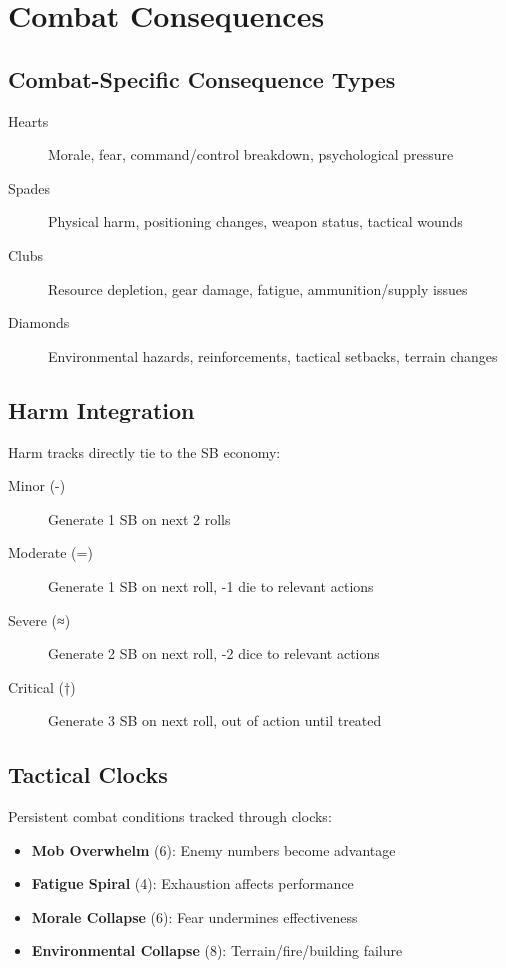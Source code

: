 \section{Combat Consequences}

\subsection*{Combat-Specific Consequence Types}
\begin{description}
  \item[Hearts] Morale, fear, command/control breakdown, psychological pressure
  \item[Spades] Physical harm, positioning changes, weapon status, tactical wounds
  \item[Clubs] Resource depletion, gear damage, fatigue, ammunition/supply issues
  \item[Diamonds] Environmental hazards, reinforcements, tactical setbacks, terrain changes
\end{description}

\subsection*{Harm Integration}
Harm tracks directly tie to the SB economy:
\begin{description}
  \item[Minor (-)] Generate 1 SB on next 2 rolls
  \item[Moderate (=)] Generate 1 SB on next roll, -1 die to relevant actions
  \item[Severe (≈)] Generate 2 SB on next roll, -2 dice to relevant actions  
  \item[Critical (†)] Generate 3 SB on next roll, out of action until treated
\end{description}

\subsection*{Tactical Clocks}
Persistent combat conditions tracked through clocks:
\begin{itemize}
  \item \textbf{Mob Overwhelm} (6): Enemy numbers become advantage
  \item \textbf{Fatigue Spiral} (4): Exhaustion affects performance
  \item \textbf{Morale Collapse} (6): Fear undermines effectiveness
  \item \textbf{Environmental Collapse} (8): Terrain/fire/building failure
\end{itemize}


